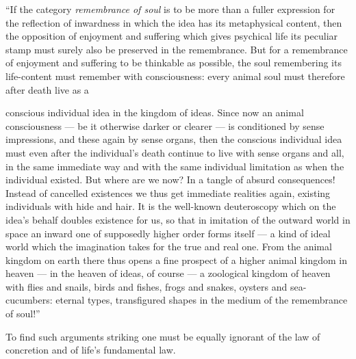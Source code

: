 \documentclass[12pt,a4paper]{book}
\begin{document}
``If the category \emph{remembrance of soul} is to be more than a fuller expression for
the reflection of inwardness in which the idea has its metaphysical content, then the
opposition of enjoyment and suffering which gives psychical life its peculiar stamp
must surely also be preserved in the remembrance. But for a remembrance of enjoyment
and suffering to be thinkable as possible, the soul remembering its life-content must
remember with consciousness: every animal soul must therefore after death live as a

conscious individual idea in the kingdom of ideas. Since now an animal consciousness ---
be it otherwise darker or clearer --- is conditioned by sense impressions, and these
again by sense organs, then the conscious individual idea must even after the
individual's death continue to live with sense organs and all, in the same immediate
way and with the same individual limitation as when the individual existed. But where
are we now? In a tangle of absurd consequences! Instead of cancelled existences we thus
get immediate realities again, existing individuals with hide and hair. It is the
well-known deuteroscopy which on the idea's behalf doubles existence for us, so that in
imitation of the outward world in space an inward one of supposedly higher order forms
itself --- a kind of ideal world which the imagination takes for the true and real one.
From the animal kingdom on earth there thus opens a fine prospect of a higher animal
kingdom in heaven --- in the heaven of ideas, of course --- a zoological kingdom of
heaven with flies and snails, birds and fishes, frogs and snakes, oysters and
sea-cucumbers: eternal types, transfigured shapes in the medium of the remembrance of
soul!''

To find such arguments striking one must be equally ignorant of the law of concretion
and of life's fundamental law.
\end{document}

